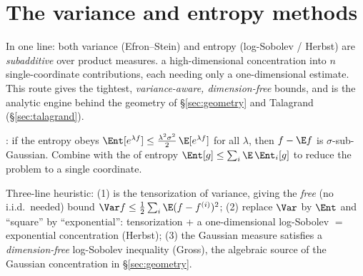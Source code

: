 \section{The variance and entropy methods}\label{sec:entropy}
\quad{}

\begin{strand}
In one line: both variance (Efron–Stein) and entropy (log-Sobolev / Herbst) are \emph{subadditive}
over product measures.  a high-dimensional concentration into $n$ single-coordinate
contributions, each needing only a one-dimensional estimate. This route gives the tightest,
\emph{variance-aware, dimension-free} bounds, and is the analytic engine behind the geometry of
§\ref{sec:geometry} and Talagrand (§\ref{sec:talagrand}).
\end{strand}

: if the entropy obeys $\Ent[e^{\lambda f}]\le \tfrac{\lambda^2\sigma^2}{2}\,\E[e^{\lambda f}]$
for all $\lambda$, then $f-\E f$ is $\sigma$-sub-Gaussian. Combine with the  of entropy
$\Ent[g]\le \sum_i \E\,\Ent_i[g]$ to reduce the problem to a single coordinate.

\begin{strand}
Three-line heuristic: (1)  is the tensorization of variance, giving the \emph{free}
(no i.i.d.\ needed) bound $\Var f\le \tfrac12\sum_i\E(f-f^{(i)})^2$; (2) replace $\Var$ by $\Ent$ and ``square''
by ``exponential'': tensorization + a one-dimensional log-Sobolev $=$ exponential concentration (Herbst);
(3) the Gaussian measure satisfies a \emph{dimension-free} log-Sobolev inequality (Gross), the algebraic source
of the Gaussian concentration in §\ref{sec:geometry}.
\end{strand}

